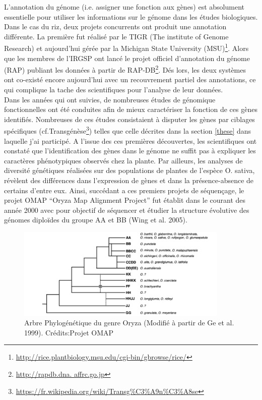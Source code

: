 L'annotation du génome (i.e. assigner une fonction aux gènes) est absolument essentielle pour utiliser les informations sur le génome dans les études biologiques. Dans le cas du riz, deux projets concurrents ont produit une annotation différente. La première fut réalisé par le TIGR (The institute of Genome Research) et aujourd'hui gérée par la Michigan State University (MSU)\footnote{\url{http://rice.plantbiology.msu.edu/cgi-bin/gbrowse/rice/}}. Alors que les membres de l'IRGSP ont lancé le projet officiel d'annotation du génome (RAP) publiant les données à partir de RAP-DB\footnote{\url{http://rapdb.dna. affrc.go.jp}}. Dés lors, les deux systèmes ont co-existé encore aujourd'hui avec un recouvrement partiel des annotations, ce qui complique la tache des scientifiques pour l'analyse de leur données.\\

Dans les années qui ont suivies, de nombreuses études de génomique fonctionnelles ont été conduites afin de mieux caractériser la fonction de ces gènes identifiés. Nombreuses de ces études consistaient à disputer les gènes par ciblages spécifiques (cf.Transgénèse\footnote{\url{https://fr.wikipedia.org/wiki/Transg\%C3\%A9n\%C3\%A8se}}) telles que celle décrites dans la section \ref{these} dans laquelle j'ai participé. A l'issue des ces premières découvertes, les scientifiques ont constaté que l'identification des gènes dans le génome ne suffit pas à expliquer les caractères phénotypiques observés chez la plante.  Par ailleurs, les analyses de diversité génétiques réalisées sur des populations de plantes de l'espèce O. sativa, révèlent des différences dans l'expression de gènes et dans la présence-absence de certains d'entre eux. Ainsi, succédant a ces premiers projets de séquençage, le projet OMAP “Oryza Map Alignment Project” fut établit dans le courant des année 2000 avec pour objectif de séquencer et étudier la structure évolutive des génomes diploïdes du groupe AA et BB (Wing et al. 2005).\\ 

\begin{figure}[!ht]
    \centering
    \includegraphics[width=0.9\textwidth]{hdr_manuscript/Figures/pylogenetic-tree.png}
    \caption{Arbre Phylogénétique du genre Oryza (Modifié à partir de Ge et al. 1999).  Crédits:Projet OMAP}
    \label{fig:genus}
\end{figure}


